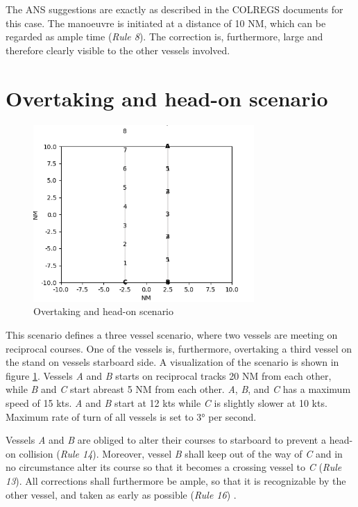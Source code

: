 The ANS suggestions are exactly as described in the COLREGS documents for this case. The manoeuvre is initiated at a distance of 10 NM, which can be regarded as ample time (\textit{Rule 8}). The correction is, furthermore, large and therefore clearly visible to the other vessels involved.

\section{Overtaking and head-on scenario}%


\begin{figure}[H]
    \centering
    \includegraphics[width=0.75\textwidth,height=0.75\textheight,keepaspectratio]{../src/img/overtaking_head_on.png}
    \caption[Overtaking and head-on scenario]{Overtaking and head-on scenario  \cite{ecolreg_overtaking-and-head-on}}
    \label{fig:overtaking-and-head-on}
\end{figure}
This scenario defines a three vessel scenario, where two vessels are meeting on  reciprocal courses. One of the vessels is, furthermore, overtaking a third vessel on the stand on vessels starboard side. A visualization of the scenario is shown in figure \ref{fig:overtaking-and-head-on}. Vessels \textit{A} and \textit{B} starts on reciprocal tracks 20 NM from each other, while \textit{B} and \textit{C} start abreast 5 NM from each other. \textit{A}, \textit{B}, and \textit{C} has a maximum speed of 15 kts. \textit{A} and \textit{B} start at 12 kts while \textit{C} is slightly slower at 10 kts. Maximum rate of turn of all vessels is set to \ang{3} per second.

Vessels \textit{A} and \textit{B} are obliged to alter their courses to starboard to prevent a head-on collision (\textit{Rule 14}). Moreover, vessel \textit{B} shall keep out of the way of \textit{C}  and in no circumstance alter its course so that it becomes a crossing vessel to \textit{C} (\textit{Rule 13}). All corrections shall furthermore be ample, so that it is recognizable by the other vessel, and taken as early as possible (\textit{Rule 16}) \cite{ecolreg_overtaking-and-head-on}.

